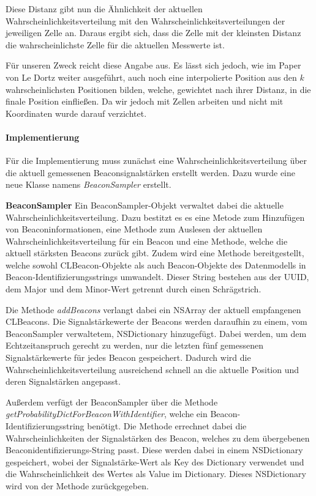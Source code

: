 Diese Distanz gibt nun die Ähnlichkeit der aktuellen Wahrscheinlichkeitsverteilung mit den Wahrscheinlichkeitsverteilungen der jeweiligen Zelle an. Daraus ergibt sich, dass die Zelle mit der kleinsten Distanz die wahrscheinlichste Zelle für die aktuellen Messwerte ist.

Für unseren Zweck reicht diese Angabe aus. Es lässt sich jedoch, wie im Paper von Le Dortz \cite{wifiFingerprintProbability} weiter ausgeführt, auch noch eine interpolierte Position aus den $k$ wahrscheinlichsten Positionen bilden, welche, gewichtet nach ihrer Distanz, in die finale Position einfließen. Da wir jedoch mit Zellen arbeiten und nicht mit Koordinaten wurde darauf verzichtet. 

\paragraph{Implementierung}
\label{sec:implementation:fingerprinting:positioning:probability:implementiation}
Für die Implementierung muss zunächst eine Wahrscheinlichkeitsverteilung über die aktuell gemessenen Beaconsignalstärken erstellt werden. Dazu wurde eine neue Klasse namens \emph{BeaconSampler} erstellt. 


\textbf{BeaconSampler}
Ein BeaconSampler-Objekt verwaltet dabei die aktuelle Wahrscheinlichkeitsverteilung. Dazu bestitzt es es eine Metode zum Hinzufügen von Beaconinformationen, eine Methode zum Auslesen der aktuellen Wahrscheinlichkeitsverteilung für ein Beacon und eine Methode, welche die aktuell stärksten Beacons zurück gibt. Zudem wird eine Methode bereitgestellt, welche sowohl CLBeacon-Objekte als auch Beacon-Objekte des Datenmodells in Beacon-Identifizierungsstrings umwandelt. Dieser String bestehen aus der UUID, dem Major und dem Minor-Wert getrennt durch einen Schrägstrich.

Die Methode \emph{addBeacons} verlangt dabei ein NSArray der aktuell empfangenen CLBeacons. Die Signalstärkewerte der Beacons werden daraufhin zu einem, vom BeaconSampler verwaltetem, NSDictionary hinzugefügt. Dabei werden, um dem Echtzeitanspruch gerecht zu werden, nur die letzten fünf gemessenen Signalstärkewerte für jedes Beacon gespeichert. Dadurch wird die Wahrscheinlichkeitsverteilung ausreichend schnell an die aktuelle Position und deren Signalstärken angepasst.

Außerdem verfügt der BeaconSampler über die Methode \emph{getProbabilityDictForBeaconWithIdentifier}, welche ein Beacon-Identifizierungsstring benötigt. Die Methode errechnet dabei die Wahrscheinlichkeiten der Signalstärken des Beacon, welches zu dem übergebenen Beaconidentifizierungs-String passt. Diese werden dabei in einem NSDictionary gespeichert, wobei der Signalstärke-Wert als Key des Dictionary verwendet und die Wahrscheinlichkeit des Wertes als Value im Dictionary. Dieses NSDictionary wird von der Methode zurückgegeben.

